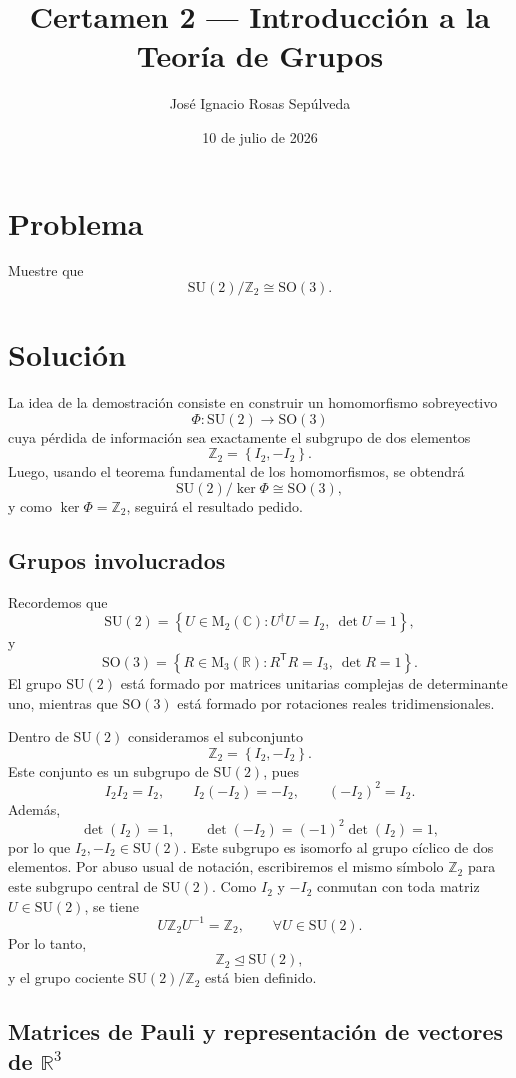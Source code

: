 \documentclass[11pt,a4paper]{article}
\title{Certamen 2 --- Introducción a la Teoría de Grupos}
\author{José Ignacio Rosas Sepúlveda}
\date{10 de julio de 2026}
\newcommand{\R}{\mathbb{R}}
\newcommand{\C}{\mathbb{C}}
\newcommand{\M}{\mathrm{M}}
\newcommand{\SU}{\mathrm{SU}}
\newcommand{\SO}{\mathrm{SO}}
\newcommand{\set}[1]{\left\{#1\right\}}
\begin{document}
\maketitle

\section*{Problema}

Muestre que
\[
\SU(2)/\mathbb{Z}_2\cong\SO(3).
\]

\section*{Solución}

La idea de la demostración consiste en construir un homomorfismo sobreyectivo
\[
\Phi:\SU(2)\longrightarrow\SO(3)
\]
cuya pérdida de información sea exactamente el subgrupo de dos elementos
\[
\mathbb{Z}_2=\set{I_2,-I_2}.
\]
Luego, usando el teorema fundamental de los homomorfismos, se obtendrá
\[
\SU(2)/\ker\Phi\cong\SO(3),
\]
y como $\ker\Phi=\mathbb{Z}_2$, seguirá el resultado pedido.

\subsection*{Grupos involucrados}

Recordemos que
\[
\SU(2)=\set{U\in\M_2(\C):U^\dagger U=I_2,\ \det U=1},
\]
y
\[
\SO(3)=\set{R\in\M_3(\R):R^{\mathsf T}R=I_3,\ \det R=1}.
\]
El grupo $\SU(2)$ está formado por matrices unitarias complejas de determinante uno, mientras que $\SO(3)$ está formado por rotaciones reales tridimensionales.

Dentro de $\SU(2)$ consideramos el subconjunto
\[
\mathbb{Z}_2=\set{I_2,-I_2}.
\]
Este conjunto es un subgrupo de $\SU(2)$, pues
\[
I_2I_2=I_2,\qquad I_2(-I_2)=-I_2,\qquad (-I_2)^2=I_2.
\]
Además,
\[
\det(I_2)=1,\qquad \det(-I_2)=(-1)^2\det(I_2)=1,
\]
por lo que $I_2,-I_2\in\SU(2)$. Este subgrupo es isomorfo al grupo cíclico de dos elementos. Por abuso usual de notación, escribiremos el mismo símbolo $\mathbb{Z}_2$ para este subgrupo central de $\SU(2)$. Como $I_2$ y $-I_2$ conmutan con toda matriz $U\in\SU(2)$, se tiene
\[
U\mathbb{Z}_2U^{-1}=\mathbb{Z}_2,\qquad \forall U\in\SU(2).
\]
Por lo tanto,
\[
\mathbb{Z}_2\trianglelefteq\SU(2),
\]
y el grupo cociente $\SU(2)/\mathbb{Z}_2$ está bien definido.

\subsection*{Matrices de Pauli y representación de vectores de $\R^3$}
\end{document}
